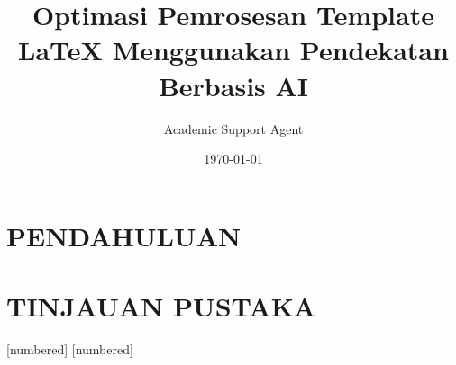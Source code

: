 \documentclass{beamer}
\title{Optimasi Pemrosesan Template LaTeX Menggunakan Pendekatan Berbasis AI}
\author{Academic Support Agent}
\date{\today}
\begin{document}
\maketitle

\begin{abstract}

\end{abstract}

\chapter{PENDAHULUAN}


\chapter{TINJAUAN PUSTAKA}


\usepackage[utf8]{inputenc}

\usepackage{booktabs} 
\usepackage{subcaption}


\newtheorem{conj}{Conjetura}
\newtheorem{defi}{Definição}
\newtheorem{teo}{Teorema}
\newtheorem{lema}{Lema}
\newtheorem{prop}{Proposição}
\newtheorem{cor}{Corolário}
\newtheorem{ex}{Exemplo}
\newtheorem{exer}{Exercício}

[numbered]
[numbered]



\end{document}
